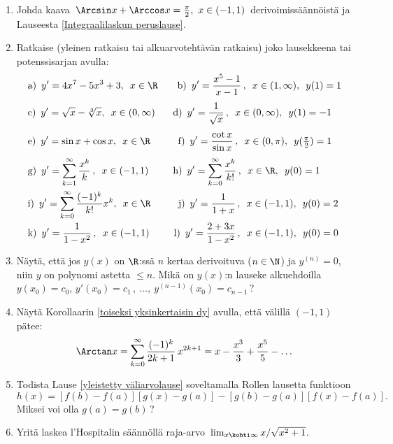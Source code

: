 \begin{enumerate}
\item
Johda kaava $\,\Arcsin x + \Arccos x=\frac{\pi}{2},\ x\in(-1,1)\,$ derivoimissäännöistä ja
Lauseesta \ref{Integraalilaskun peruslause}.

\item
Ratkaise (yleinen ratkaisu tai alkuarvotehtävän ratkaisu) joko lausekkeena tai potenssisarjan
avulla:
\begin{align*}
&\text{a)}\,\ y'=4x^7-5x^3+3,\,\ x\in\R \qquad
 \text{b)}\,\ y'=\frac{x^5-1}{x-1}\,,\,\ x\in(1,\infty),\,\ y(1)=1 \\[1mm]
&\text{c)}\,\ y'=\sqrt{x}-\sqrt[3]{x},\,\ x\in(0,\infty) \quad\,\ \
 \text{d)}\,\ y'=\frac{1}{\sqrt{x}}\,,\,\ x\in(0,\infty),\,\ y(1)=-1 \\[1mm]
&\text{e)}\,\ y'=\sin x+\cos x,\,\ x\in\R \qquad\,\ \
 \text{f)}\,\ y'=\frac{\cot x}{\sin x}\,,\,\ x\in(0,\pi),\,\ y(\tfrac{\pi}{2})=1 \\[1mm]
&\text{g)}\,\ y'=\sum_{k=1}^\infty \frac{x^k}{k}\,,\,\ x\in(-1,1) \qquad\,\
 \text{h)}\,\ y'=\sum_{k=0}^\infty \frac{x^k}{k!}\,,\,\ x\in\R,\,\ y(0)=1 \\
&\text{i)}\,\ y'=\sum_{k=0}^\infty \frac{(-1)^k}{k!}x^k,\,\ x\in\R \qquad\,\ \
 \text{j)}\,\ y'=\frac{1}{1+x}\,,\,\ x\in(-1,1),\,\ y(0)=2 \\
&\text{k)}\,\ y'=\frac{1}{1-x^2}\,,\,\ x\in(-1,1) \qquad\,\
 \text{l)}\,\ y'=\frac{2+3x}{1-x^2}\,,\,\ x\in(-1,1),\,\ y(0)=0
\end{align*}

\item
Näytä, että jos $y(x)$ on $\R$:ssä $n$ kertaa derivoituva ($n\in\N$) ja $y^{(n)}=0$, niin
$y$ on polynomi astetta $\le n$. Mikä on $y(x)$:n lauseke alkuehdoilla $y(x_0)=c_0$,
$y'(x_0)=c_1\,,\ \ldots,\ y^{(n-1)}(x_0)=c_{n-1}$\,?

\item
Näytä Korollaarin \ref{toiseksi yksinkertaisin dy} avulla, että välillä $(-1,1)$ pätee:
\[
\Arctan x=\sum_{k=0}^\infty \frac{(-1)^{k}}{2k+1}\,x^{2k+1}
         = x-\frac{x^3}{3}+\frac{x^5}{5}- \ldots
\]

\item \label{H-V-6: yleistetty väliarvolause}
Todista Lause \ref{yleistetty väliarvolause} soveltamalla Rollen lausetta funktioon
\[
h(x) = [f(b)-f(a)][g(x)-g(a)]-[g(b)-g(a)][f(x)-f(a)].
\]
Miksei voi olla $g(a)=g(b)$\,?

\item
Yritä laskea l'Hospitalin säännöllä raja-arvo $\,\lim_{x\kohti\infty} x/\sqrt{x^2+1}$.


\end{enumerate}
